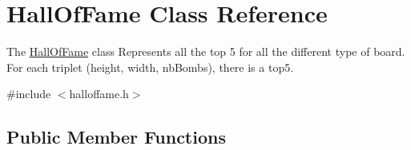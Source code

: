 \hypertarget{class_hall_of_fame}{}\section{Hall\+Of\+Fame Class Reference}
\label{class_hall_of_fame}


The \hyperlink{class_hall_of_fame}{Hall\+Of\+Fame} class Represents all the top 5 for all the different type of board. For each triplet (height, width, nb\+Bombs), there is a top5.  




{\ttfamily \#include $<$halloffame.\+h$>$}

\subsection*{Public Member Functions}
